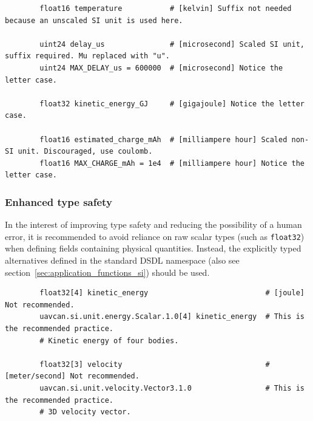 \begin{remark}
    \begin{verbatim}
        float16 temperature           # [kelvin] Suffix not needed because an unscaled SI unit is used here.

        uint24 delay_us               # [microsecond] Scaled SI unit, suffix required. Mu replaced with "u".
        uint24 MAX_DELAY_us = 600000  # [microsecond] Notice the letter case.

        float32 kinetic_energy_GJ     # [gigajoule] Notice the letter case.

        float16 estimated_charge_mAh  # [milliampere hour] Scaled non-SI unit. Discouraged, use coulomb.
        float16 MAX_CHARGE_mAh = 1e4  # [milliampere hour] Notice the letter case.
    \end{verbatim}
\end{remark}

\subsubsection{Enhanced type safety}

In the interest of improving type safety and reducing the possibility of a human error,
it is recommended to avoid reliance on raw scalar types (such as \verb|float32|)
when defining fields containing physical quantities.
Instead, the explicitly typed alternatives defined in the standard DSDL namespace
 (also see section~\ref{sec:application_functions_si}) should be used.

\begin{remark}
    \begin{verbatim}
        float32[4] kinetic_energy                           # [joule] Not recommended.
        uavcan.si.unit.energy.Scalar.1.0[4] kinetic_energy  # This is the recommended practice.
        # Kinetic energy of four bodies.

        float32[3] velocity                                 # [meter/second] Not recommended.
        uavcan.si.unit.velocity.Vector3.1.0                 # This is the recommended practice.
        # 3D velocity vector.
    \end{verbatim}
\end{remark}
